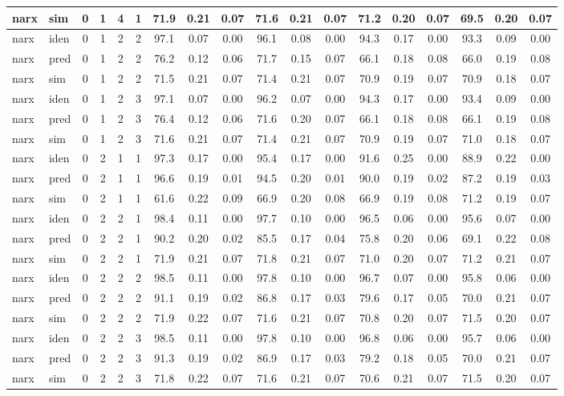 \begin{landscape}
\begin{center}
\begin{longtable}{ll|cccc|ccc|ccc|ccc|ccc}
narx & sim  & 0 & 1 & 4 & 1 & 71.9 & 0.21 & 0.07 & 71.6 & 0.21 & 0.07 & 71.2 & 0.20 & 0.07 & 69.5 & 0.20 & 0.07 \\ 
 \hline 
narx & iden & 0 & 1 & 2 & 2 & 97.1 & 0.07 & 0.00 & 96.1 & 0.08 & 0.00 & 94.3 & 0.17 & 0.00 & 93.3 & 0.09 & 0.00 \\ 
narx & pred & 0 & 1 & 2 & 2 & 76.2 & 0.12 & 0.06 & 71.7 & 0.15 & 0.07 & 66.1 & 0.18 & 0.08 & 66.0 & 0.19 & 0.08 \\ 
narx & sim  & 0 & 1 & 2 & 2 & 71.5 & 0.21 & 0.07 & 71.4 & 0.21 & 0.07 & 70.9 & 0.19 & 0.07 & 70.9 & 0.18 & 0.07 \\ 
 \hline 
narx & iden & 0 & 1 & 2 & 3 & 97.1 & 0.07 & 0.00 & 96.2 & 0.07 & 0.00 & 94.3 & 0.17 & 0.00 & 93.4 & 0.09 & 0.00 \\ 
narx & pred & 0 & 1 & 2 & 3 & 76.4 & 0.12 & 0.06 & 71.6 & 0.20 & 0.07 & 66.1 & 0.18 & 0.08 & 66.1 & 0.19 & 0.08 \\ 
narx & sim  & 0 & 1 & 2 & 3 & 71.6 & 0.21 & 0.07 & 71.4 & 0.21 & 0.07 & 70.9 & 0.19 & 0.07 & 71.0 & 0.18 & 0.07 \\ 
 \hline 
narx & iden & 0 & 2 & 1 & 1 & 97.3 & 0.17 & 0.00 & 95.4 & 0.17 & 0.00 & 91.6 & 0.25 & 0.00 & 88.9 & 0.22 & 0.00 \\ 
narx & pred & 0 & 2 & 1 & 1 & 96.6 & 0.19 & 0.01 & 94.5 & 0.20 & 0.01 & 90.0 & 0.19 & 0.02 & 87.2 & 0.19 & 0.03 \\ 
narx & sim  & 0 & 2 & 1 & 1 & 61.6 & 0.22 & 0.09 & 66.9 & 0.20 & 0.08 & 66.9 & 0.19 & 0.08 & 71.2 & 0.19 & 0.07 \\ 
 \hline 
narx & iden & 0 & 2 & 2 & 1 & 98.4 & 0.11 & 0.00 & 97.7 & 0.10 & 0.00 & 96.5 & 0.06 & 0.00 & 95.6 & 0.07 & 0.00 \\ 
narx & pred & 0 & 2 & 2 & 1 & 90.2 & 0.20 & 0.02 & 85.5 & 0.17 & 0.04 & 75.8 & 0.20 & 0.06 & 69.1 & 0.22 & 0.08 \\ 
narx & sim  & 0 & 2 & 2 & 1 & 71.9 & 0.21 & 0.07 & 71.8 & 0.21 & 0.07 & 71.0 & 0.20 & 0.07 & 71.2 & 0.21 & 0.07 \\ 
 \hline 
narx & iden & 0 & 2 & 2 & 2 & 98.5 & 0.11 & 0.00 & 97.8 & 0.10 & 0.00 & 96.7 & 0.07 & 0.00 & 95.8 & 0.06 & 0.00 \\ 
narx & pred & 0 & 2 & 2 & 2 & 91.1 & 0.19 & 0.02 & 86.8 & 0.17 & 0.03 & 79.6 & 0.17 & 0.05 & 70.0 & 0.21 & 0.07 \\ 
narx & sim  & 0 & 2 & 2 & 2 & 71.9 & 0.22 & 0.07 & 71.6 & 0.21 & 0.07 & 70.8 & 0.20 & 0.07 & 71.5 & 0.20 & 0.07 \\ 
 \hline 
narx & iden & 0 & 2 & 2 & 3 & 98.5 & 0.11 & 0.00 & 97.8 & 0.10 & 0.00 & 96.8 & 0.06 & 0.00 & 95.7 & 0.06 & 0.00 \\ 
narx & pred & 0 & 2 & 2 & 3 & 91.3 & 0.19 & 0.02 & 86.9 & 0.17 & 0.03 & 79.2 & 0.18 & 0.05 & 70.0 & 0.21 & 0.07 \\ 
narx & sim  & 0 & 2 & 2 & 3 & 71.8 & 0.22 & 0.07 & 71.6 & 0.21 & 0.07 & 70.6 & 0.21 & 0.07 & 71.5 & 0.20 & 0.07 \\ 
 \hline 
\end{longtable} 
\normalsize \end{center} 
 \end{landscape}